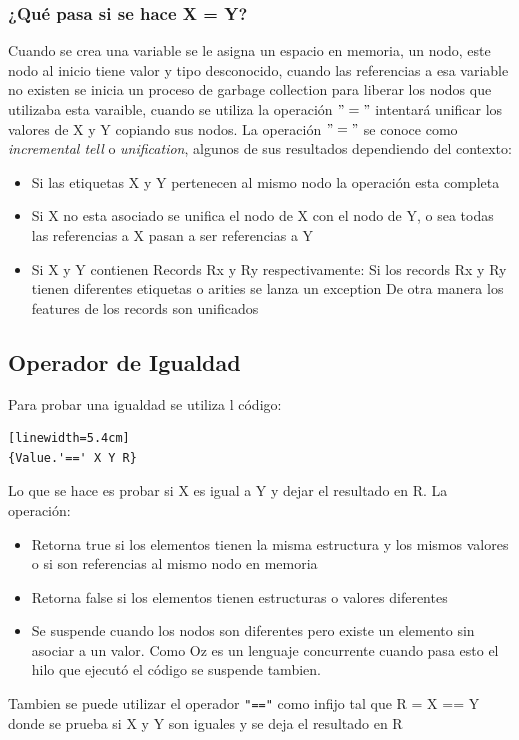 \documentclass[10pt,journal,compsoc]{IEEEtran}
\begin{document}
\subsubsection{¿Qu\'e pasa si se hace X = Y?}
Cuando se crea una variable se le asigna un espacio en memoria, un nodo, este nodo al inicio tiene valor y tipo desconocido, cuando las referencias a esa variable no existen se inicia un proceso de garbage collection para liberar los nodos que utilizaba esta varaible, cuando se utiliza la operaci\'on $"="$ intentar\'a unificar los valores de X y Y copiando sus nodos. La operaci\'on $"="$ se conoce como \emph{incremental tell} o \emph{unification}, algunos de sus resultados dependiendo del contexto:
\begin{itemize}
	\item Si las etiquetas X y Y pertenecen al mismo nodo la operaci\'on esta completa
	\item Si X no esta asociado se unifica el nodo de X con el nodo de Y, o sea todas las referencias a X pasan a ser referencias a Y
	\item Si X y Y contienen Records Rx y Ry respectivamente:
		\subitem Si los records Rx y Ry tienen diferentes etiquetas o arities se lanza un exception
		\subitem De otra manera los features de los records son unificados
\end{itemize}

\subsection{Operador de Igualdad}
Para probar una igualdad se utiliza l c\'odigo:
\begin{lstlisting}[language=Oz, caption = {Variables en un scope}][linewidth=5.4cm]
{Value.'==' X Y R}
\end{lstlisting}
Lo que se hace es probar si X es igual a Y y dejar el resultado en R. La operaci\'on:
\begin{itemize}
	\item Retorna true si los elementos tienen la misma estructura y los mismos valores o si son referencias al mismo nodo en memoria
	\item Retorna false si los elementos tienen estructuras o valores diferentes
	\item Se suspende cuando los nodos son diferentes pero existe un elemento sin asociar a un valor. Como Oz es un lenguaje concurrente cuando pasa esto el hilo que ejecut\'o el c\'odigo se suspende tambien.
\end{itemize}
Tambien se puede utilizar el operador \verb|"=="| como infijo tal que R = X == Y donde se prueba si X y Y son iguales y se deja el resultado en R
\end{document}
